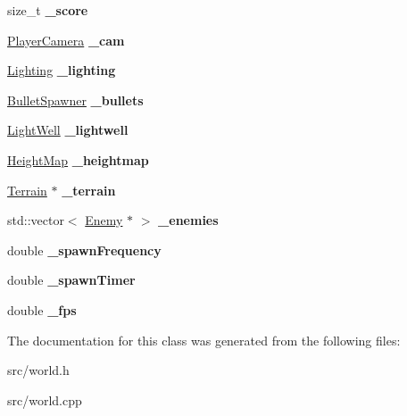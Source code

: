 \begin{DoxyCompactItemize}
\item 
\hypertarget{class_world_a41d7fe11feb33f45c28c6beec25cecf6}{}size\+\_\+t {\bfseries \+\_\+score}\label{class_world_a41d7fe11feb33f45c28c6beec25cecf6}

\item 
\hypertarget{class_world_aff20ebc091e78248b5da276320940fca}{}\hyperlink{class_player_camera}{Player\+Camera} {\bfseries \+\_\+cam}\label{class_world_aff20ebc091e78248b5da276320940fca}

\item 
\hypertarget{class_world_a22b8f41ae05bcd239bfdb7e598fbf89d}{}\hyperlink{class_lighting}{Lighting} {\bfseries \+\_\+lighting}\label{class_world_a22b8f41ae05bcd239bfdb7e598fbf89d}

\item 
\hypertarget{class_world_a83081a0365622f65795c43baa5c71a0b}{}\hyperlink{class_bullet_spawner}{Bullet\+Spawner} {\bfseries \+\_\+bullets}\label{class_world_a83081a0365622f65795c43baa5c71a0b}

\item 
\hypertarget{class_world_a7265fce4e1994d1bca454fa2be12e77c}{}\hyperlink{class_light_well}{Light\+Well} {\bfseries \+\_\+lightwell}\label{class_world_a7265fce4e1994d1bca454fa2be12e77c}

\item 
\hypertarget{class_world_a5589b931efb38240e8a3581376e5fb8b}{}\hyperlink{class_height_map}{Height\+Map} {\bfseries \+\_\+heightmap}\label{class_world_a5589b931efb38240e8a3581376e5fb8b}

\item 
\hypertarget{class_world_ae670e228a727dc5aedf65eb026689633}{}\hyperlink{class_terrain}{Terrain} $\ast$ {\bfseries \+\_\+terrain}\label{class_world_ae670e228a727dc5aedf65eb026689633}

\item 
\hypertarget{class_world_a75b7ba1e6a667e2b2d6d621a470c3a97}{}std\+::vector$<$ \hyperlink{class_enemy}{Enemy} $\ast$ $>$ {\bfseries \+\_\+enemies}\label{class_world_a75b7ba1e6a667e2b2d6d621a470c3a97}

\item 
\hypertarget{class_world_a05234bbcb9027332684d294249f9663a}{}double {\bfseries \+\_\+spawn\+Frequency}\label{class_world_a05234bbcb9027332684d294249f9663a}

\item 
\hypertarget{class_world_a652133a3af10cc8ce6cd1f1d9a2dbd30}{}double {\bfseries \+\_\+spawn\+Timer}\label{class_world_a652133a3af10cc8ce6cd1f1d9a2dbd30}

\item 
\hypertarget{class_world_a93a99a7308e67ea269cef6263d728559}{}double {\bfseries \+\_\+fps}\label{class_world_a93a99a7308e67ea269cef6263d728559}

\end{DoxyCompactItemize}


The documentation for this class was generated from the following files\+:\begin{DoxyCompactItemize}
\item 
src/world.\+h\item 
src/world.\+cpp\end{DoxyCompactItemize}
